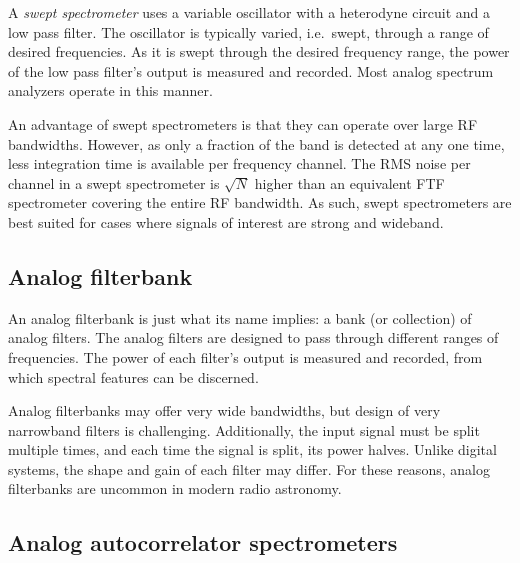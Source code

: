 \documentclass{ws-rv961x669}
\begin{document}
A \emph{swept spectrometer} uses a variable oscillator with a heterodyne
circuit and a low pass filter. The oscillator is typically varied, i.e.~swept, through a range of desired frequencies. As it is swept through the desired frequency range, the power of the low pass filter's output is measured and recorded. Most analog spectrum analyzers operate in this manner.

An advantage of swept spectrometers is that they can operate over large RF bandwidths. However, as only a fraction of the band is detected at any one time, less integration time is available per frequency channel. 
The RMS noise per channel in a swept spectrometer is $\sqrt{N}$ higher than an equivalent FTF spectrometer covering the entire RF bandwidth. As such, swept spectrometers are best suited for cases where signals of interest are strong and wideband. 

\subsection{Analog filterbank}\label{analog-filter-bank}

An analog filterbank is just what its name implies: a bank (or collection) of analog filters. The analog filters are designed to pass through different ranges of frequencies. The power of each filter's output is measured and recorded, from which spectral features can be discerned. 


Analog filterbanks may offer very wide bandwidths, but design of very narrowband filters is challenging. Additionally, the input signal must be split multiple times, and each time the signal is split, its power halves. Unlike digital systems, the shape and gain of each filter may differ. For these reasons, analog filterbanks are uncommon in modern radio astronomy.

\subsection{Analog autocorrelator spectrometers}\label{sub:analog-acs}
\end{document}
